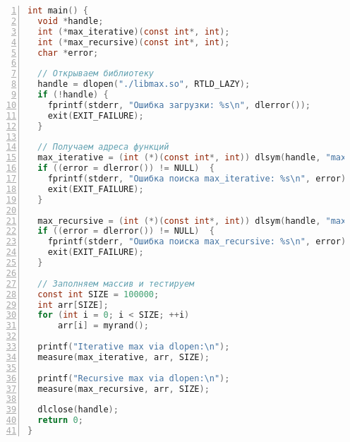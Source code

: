 \begin{lstlisting}[language=C,numbers=left]
int main() {
  void *handle;
  int (*max_iterative)(const int*, int);
  int (*max_recursive)(const int*, int);
  char *error;

  // Открываем библиотеку
  handle = dlopen("./libmax.so", RTLD_LAZY);
  if (!handle) {
    fprintf(stderr, "Ошибка загрузки: %s\n", dlerror());
    exit(EXIT_FAILURE);
  }

  // Получаем адреса функций
  max_iterative = (int (*)(const int*, int)) dlsym(handle, "max_iterative");
  if ((error = dlerror()) != NULL)  {
    fprintf(stderr, "Ошибка поиска max_iterative: %s\n", error);
    exit(EXIT_FAILURE);
  }

  max_recursive = (int (*)(const int*, int)) dlsym(handle, "max_recursive");
  if ((error = dlerror()) != NULL)  {
    fprintf(stderr, "Ошибка поиска max_recursive: %s\n", error);
    exit(EXIT_FAILURE);
  }

  // Заполняем массив и тестируем
  const int SIZE = 100000;
  int arr[SIZE];
  for (int i = 0; i < SIZE; ++i)
      arr[i] = myrand();

  printf("Iterative max via dlopen:\n");
  measure(max_iterative, arr, SIZE);

  printf("Recursive max via dlopen:\n");
  measure(max_recursive, arr, SIZE);

  dlclose(handle);
  return 0;
}

\end{lstlisting}